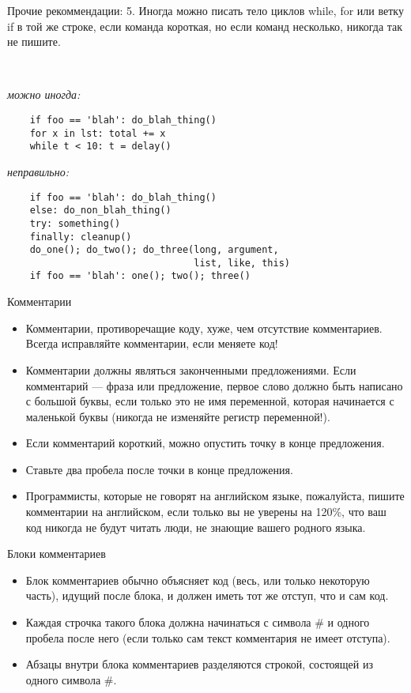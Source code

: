 \documentclass[xcolor=table]{beamer}
\begin{document}
\begin{frame}[fragile]{Прочие рекоммендации:}
	5. Иногда можно писать тело циклов while, for или ветку if в той же строке, если команда короткая, но если команд несколько, никогда так не пишите.
	
	~
	
	\textit{можно иногда:}	
	\begin{verbatim}
	if foo == 'blah': do_blah_thing() 
	for x in lst: total += x 
	while t < 10: t = delay()  
	\end{verbatim}
	\textit{неправильно:}	
	\begin{verbatim}
	if foo == 'blah': do_blah_thing() 
	else: do_non_blah_thing() 
	try: something() 
	finally: cleanup() 
	do_one(); do_two(); do_three(long, argument, 
                                 list, like, this) 
	if foo == 'blah': one(); two(); three()
	\end{verbatim}
\end{frame}

\begin{frame}[fragile]{Комментарии}
	\begin{itemize}
		\item Комментарии, противоречащие коду, хуже, чем отсутствие комментариев. Всегда исправляйте комментарии, если меняете код!
		\item Комментарии должны являться законченными предложениями. Если комментарий — фраза или предложение, первое слово должно быть написано с большой буквы, если только это не имя переменной, которая начинается с маленькой буквы (никогда не изменяйте регистр переменной!).
		\item Если комментарий короткий, можно опустить точку в конце предложения. 
		\item Ставьте два пробела после точки в конце предложения.
		\item Программисты, которые не говорят на английском языке, пожалуйста, пишите комментарии на английском, если только вы не уверены на 120\%, что ваш код никогда не будут читать люди, не знающие вашего родного языка.
	\end{itemize}
\end{frame}

\begin{frame}[fragile]{Блоки комментариев}
	\begin{itemize}
		\item Блок комментариев обычно объясняет код (весь, или только некоторую часть), идущий после блока, и должен иметь тот же отступ, что и сам код. 
		\item Каждая строчка такого блока должна начинаться с символа \# и одного пробела после него (если только сам текст комментария не имеет отступа).
		\item Абзацы внутри блока комментариев разделяются строкой, состоящей из одного символа \#.
	\end{itemize}
\end{frame}
\end{document}
